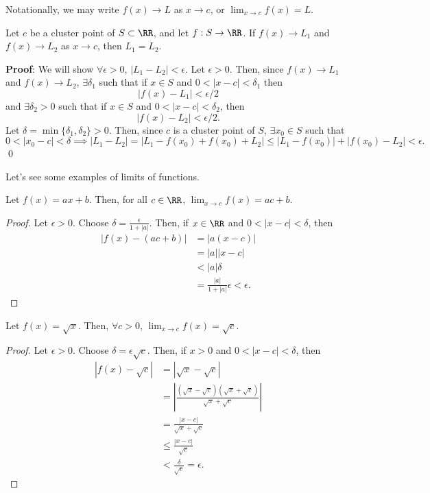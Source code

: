 \begin{notation}
Notationally, we may write $f(x) \to L$ as $x\to c$, or $\lim_{x\to c} f(x) = L$.
\end{notation}

\begin{theorem}
Let $c$ be a cluster point of $S\subset \RR$, and let $f: S\to \RR$. If $f(x) \to L_1$ and $f(x)\to L_2$ as $x\to c$, then $L_1 = L_2$.
\end{theorem}
\textbf{Proof}: We will show $\forall \epsilon>0$, $|L_1-L_2|<\epsilon$. Let $\epsilon>0$. Then, since $f(x) \to L_1$ and $f(x)\to L_2$, $\exists \delta_1$ such that if $x\in S$ and $0<|x-c|<\delta_1$ then
\[
|f(x) - L_1| < \epsilon/2
\]
and $\exists \delta_2 >0$ such that if $x\in S$ and $0<|x-c| < \delta_2$, then 
\[
|f(x) - L_2| < \epsilon/2.
\]
Let $\delta = \min\{\delta_1, \delta_2\}>0$. Then, since $c$ is a cluster point of $S$, $\exists x_0 \in S$ such that 
\[
0 < |x_0-c| < \delta \implies |L_1-L_2| = |L_1-f(x_0)+f(x_0) + L_2| \leq |L_1 - f(x_0)| + |f(x_0) -L_2| < \epsilon.
\]
\qed 

Let's see some examples of limits of functions.
\begin{example}
Let $f(x) = ax+b$. Then, for all $c\in \RR$, $\lim_{x\to c} f(x) = ac + b$.
\end{example}
\begin{proof}
Let $\epsilon>0$. Choose $\delta = \frac{\epsilon}{1+|a|}$. Then, if $x\in\RR$ and $0< |x-c|<\delta$, then 
\begin{align*}
    |f(x) - (ac+b)| &= |a(x-c)| \\
    &= |a||x-c| \\
    &< |a|\delta \\
    &= \frac{|a|}{1+|a|} \epsilon < \epsilon.
\end{align*}
\end{proof}

\begin{example}
Let $f(x) = \sqrt{x}$. Then, $\forall c>0$, $\lim_{x\to c}f(x) = \sqrt{c}$.
\end{example}
\begin{proof}
Let $\epsilon>0$. Choose $\delta = \epsilon \sqrt{c}$. Then, if $x>0$ and $0<|x-c|<\delta$, then 
\begin{align*}
    |f(x) - \sqrt{c}| &= |\sqrt{x}- \sqrt{c}| \\
    &= \left|\frac{(\sqrt{x}-\sqrt{c})(\sqrt{x}+ \sqrt{c})}{\sqrt{x}+ \sqrt{c}}\right| \\
    &= \frac{|x-c|}{\sqrt{x}+ \sqrt{c}} \\
    &\leq \frac{|x-c|}{\sqrt{c}} \\
    &< \frac{\delta}{\sqrt{c}} = \epsilon.
\end{align*}
\end{proof}

